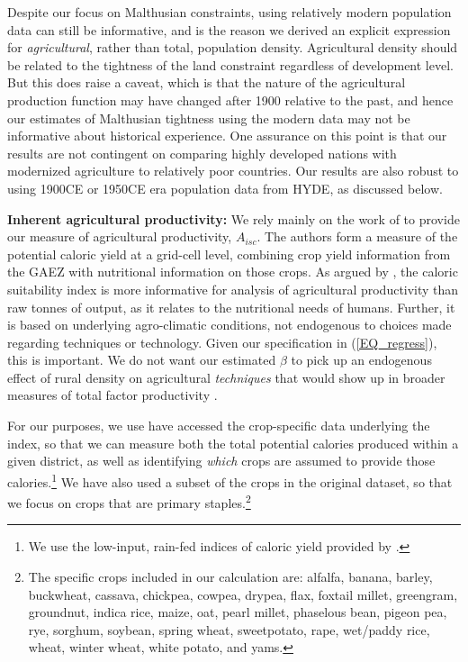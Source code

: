 \documentclass[11pt]{article}
\begin{document}
Despite our focus on Malthusian constraints, using relatively modern population data can still be informative, and is the reason we derived an explicit expression for \textit{agricultural}, rather than total, population density. Agricultural density should be related to the tightness of the land constraint regardless of development level. But this does raise a caveat, which is that the nature of the agricultural production function may have changed after 1900 relative to the past, and hence our estimates of Malthusian tightness using the modern data may not be informative about historical experience. One assurance on this point is that our results are not contingent on comparing highly developed nations with modernized agriculture to relatively poor countries. Our results are also robust to using 1900CE or 1950CE era population data from HYDE, as discussed below.

\vspace{.5cm}\noindent\textbf{Inherent agricultural productivity:} We rely mainly on the work of \citet{galorozak2016} to provide our measure of agricultural productivity, $A_{isc}$. The authors form a measure of the potential caloric yield at a grid-cell level, combining crop yield information from the GAEZ with nutritional information on those crops. As argued by \citet{galorozak2016}, the caloric suitability index is more informative for analysis of agricultural productivity than raw tonnes of output, as it relates to the nutritional needs of humans. Further, it is based on underlying agro-climatic conditions, not endogenous to choices made regarding techniques or technology. Given our specification in (\ref{EQ_regress}), this is important. We do not want our estimated $\beta$ to pick up an endogenous effect of rural density on agricultural \textit{techniques} that would show up in broader measures of total factor productivity \citep{Boserup1965}.

For our purposes, we use have accessed the crop-specific data underlying the \citet{galorozak2016} index, so that we can measure both the total potential calories produced within a given district, as well as identifying \textit{which} crops are assumed to provide those calories.\footnote{We use the low-input, rain-fed indices of caloric yield provided by \citet{galorozak2016}.} We have also used a subset of the crops in the original \citet{galorozak2016} dataset, so that we focus on crops that are primary staples.\footnote{The specific crops included in our calculation are: alfalfa, banana, barley, buckwheat, cassava, chickpea, cowpea, drypea, flax, foxtail millet, greengram, groundnut, indica rice, maize, oat, pearl millet, phaselous bean, pigeon pea, rye, sorghum, soybean, spring wheat, sweetpotato, rape, wet/paddy rice, wheat, winter wheat, white potato, and yams.} 
\end{document}
